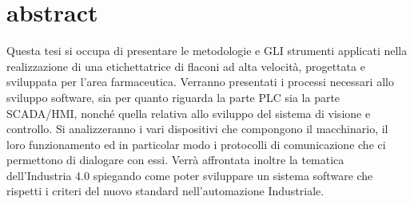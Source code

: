 \documentclass[12pt, a4paper, oneside]{book}
\begin{document}
\tableofcontents
{}

\newpage
\thispagestyle{empty}
\listoffigures

\newpage
\thispagestyle{empty}
\section*{abstract}
Questa tesi si occupa di presentare le metodologie e GLI strumenti applicati nella realizzazione di una etichettatrice di flaconi ad alta velocità, progettata e sviluppata per l'area farmaceutica.
Verranno presentati i processi necessari allo sviluppo software, sia per quanto riguarda la parte PLC sia la parte SCADA/HMI, nonché quella relativa allo sviluppo del sistema di visione e controllo.
Si analizzeranno i vari dispositivi che compongono il macchinario, il loro funzionamento ed in particolar modo i protocolli di comunicazione che ci permettono di dialogare con essi. 
Verrà affrontata inoltre la tematica dell'Industria 4.0 spiegando come poter sviluppare un sistema software che rispetti i criteri del nuovo standard nell'automazione Industriale.
 

\newpage
\thispagestyle{empty}
\end{document}
